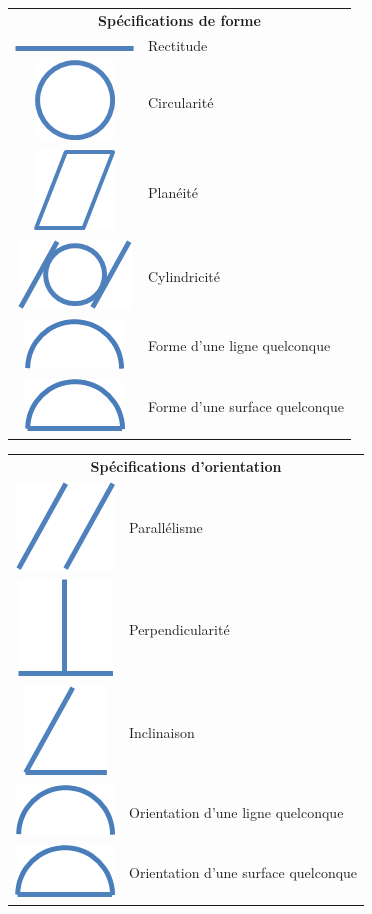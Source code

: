 \documentclass[11pt,oneside]{article}
\begin{document}
\begin{resultat}
\begin{center}
\begin{tabular}{cl}
\multicolumn{2}{c}{\textbf{Spécifications de forme}} \\
\includegraphics[width=.5cm]{png/rectitude}
& Rectitude \\
\includegraphics[width=.5cm]{png/circularite}
& Circularité\\
\includegraphics[width=.5cm]{png/planeite}
& Planéité \\
\includegraphics[width=.5cm]{png/cylindricite}
& Cylindricité \\
\includegraphics[width=.5cm]{png/ligne}
& Forme d'une ligne quelconque\\
\includegraphics[width=.5cm]{png/surface}
& Forme d'une surface quelconque\\
\end{tabular}
\begin{tabular}{cl}
\multicolumn{2}{c}{\textbf{Spécifications d'orientation}} \\
\includegraphics[width=.5cm]{png/parallelisme}
& Parallélisme \\
\includegraphics[width=.5cm]{png/perpendicularite}
& Perpendicularité \\
\includegraphics[width=.5cm]{png/inclinaison}
& Inclinaison \\
\includegraphics[width=.5cm]{png/ligne}
& Orientation d'une ligne quelconque\\
\includegraphics[width=.5cm]{png/surface}
& Orientation d'une surface quelconque\\
\end{tabular}
\end{center}


\end{resultat}
\end{document}
